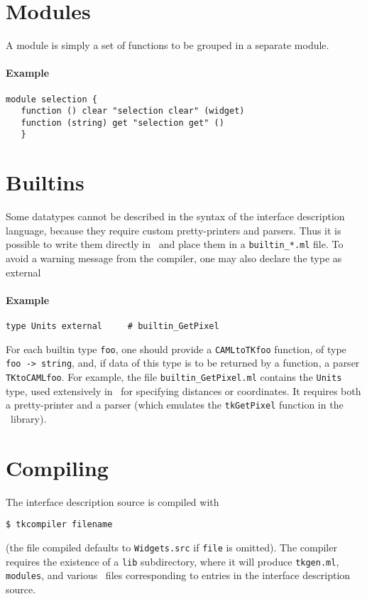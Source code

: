 \section{Modules}
A module is simply a set of functions to be grouped in a separate module.
\paragraph{Example}
\begin{verbatim}
module selection {
   function () clear "selection clear" (widget)
   function (string) get "selection get" ()
   }
\end{verbatim} 

\section{Builtins}
Some datatypes cannot be described in the syntax of the interface
description language, because they require custom pretty-printers and
parsers. Thus it is possible to write them directly in \caml\ and place
them in a \verb|builtin_*.ml| file.
To avoid a warning message from the compiler, one may also declare the type
as external
\paragraph{Example}
\begin{verbatim}
type Units external     # builtin_GetPixel
\end{verbatim} 
For each builtin type \verb|foo|, one should provide a \verb|CAMLtoTKfoo|
function, of type \verb|foo -> string|, and, if data of this type is to be
returned by a function, a parser \verb|TKtoCAMLfoo|.
For example, the file \verb|builtin_GetPixel.ml| contains the \verb|Units|
type, used extensively in \tk\ for specifying distances or coordinates.
It requires both a pretty-printer and a parser (which emulates the
\verb|tkGetPixel| function in the \tk\ library).


\section{Compiling}
The interface description source is compiled with
\begin{verbatim}
$ tkcompiler filename
\end{verbatim}
(the file compiled defaults to \verb|Widgets.src| if \verb|file| is
omitted).
The compiler requires the existence of a \verb|lib| subdirectory, where it
will produce \verb|tkgen.ml|, \verb|modules|, and various \caml\ files
corresponding to entries in the interface description source.

